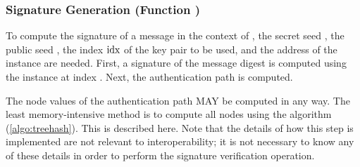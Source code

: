 
\subsubsection{\xmss Signature Generation (Function \xmsssign)}\label{sec:xmss:sign}

   To compute the \xmss signature of a message \msg in the context of \spx,
   the secret seed \sseed, the public seed \pseed, the index $\textrm{idx}$ of the
   \wotsp key
   pair to be used, and the address \adrs of the \xmss instance are needed.
   First, a \wotsp signature of the message digest is computed using the
   \wotsp instance at index \idx.  Next, the authentication path is computed.

   The node values of the authentication path MAY be computed in any
   way. The least memory-intensive method is to compute all nodes using the
   \treehash algorithm (\autoref{algo:treehash}). This is described here.
   Note that the details of how this step is implemented are not relevant to
   interoperability; it is not necessary to know any of these details in order
   to perform the signature verification operation.
%
%


